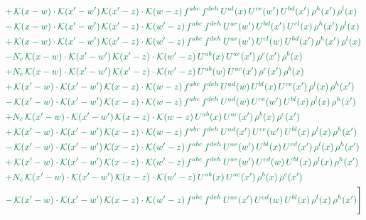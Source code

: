 \documentclass[10pt]{article}
\numberwithin{equation}{section}
\begin{document}
\begin{align}
&{\color{JIM} +\,\mathcal{K}(x-w)\cdot\mathcal{K}(x'-w')\,\mathcal{K}(x'-z)\cdot\mathcal{K}(w-z)\,f^{abc}\,f^{deh}\,U^{al}(x)\,U^{ce}(w')\,U^{bd}(x')\,\rho^{h}(x')\,\rho^{l}(x)} \notag\\
&{\color{JIM} -\,\mathcal{K}(x-w)\cdot\mathcal{K}(x'-w')\,\mathcal{K}(x'-z)\cdot\mathcal{K}(w'-z)\,f^{abc}\,f^{deh}\,U^{ae}(w')\,U^{bd}(x')\,U^{cl}(x)\,\rho^{h}(x')\,\rho^{l}(x)} \notag\\
&{\color{JIM} +\,\mathcal{K}(x-w)\cdot\mathcal{K}(x'-w')\,\mathcal{K}(x'-z)\cdot\mathcal{K}(w'-z)\,f^{abc}\,f^{deh}\,U^{ae}(w')\,U^{cl}(w)\,U^{bd}(x')\,\rho^{h}(x')\,\rho^{l}(x)} \notag\\
&{\color{JIM} -N_{c}\,\mathcal{K}(x-w)\cdot\mathcal{K}(x'-w')\,\mathcal{K}(x'-z)\cdot\mathcal{K}(w'-z)\,U^{ab}(x)\,U^{ac}(x')\,\rho^{c}(x')\,\rho^{b}(x)} \notag\\
&{\color{JIM} +N_{c}\,\mathcal{K}(x-w)\cdot\mathcal{K}(x'-w')\,\mathcal{K}(x'-z)\cdot\mathcal{K}(w'-z)\,U^{ab}(w)\,U^{ac}(x')\,\rho^{c}(x')\,\rho^{b}(x)} \notag\\
&{\color{JIM} +\,\mathcal{K}(x'-w)\cdot\mathcal{K}(x'-w')\,\mathcal{K}(x-z)\cdot\mathcal{K}(w-z)\,f^{abc}\,f^{deh}\,U^{ad}(w)\,U^{bl}(x)\,U^{ce}(x')\,\rho^{l}(x)\,\rho^{h}(x')} \notag\\
&{\color{JIM} -\,\mathcal{K}(x'-w)\cdot\mathcal{K}(x'-w')\,\mathcal{K}(x-z)\cdot\mathcal{K}(w-z)\,f^{abc}\,f^{deh}\,U^{ad}(w)\,U^{ce}(w')\,U^{bl}(x)\,\rho^{l}(x)\,\rho^{h}(x')} \notag\\
&{\color{JIM} +N_{c}\,\mathcal{K}(x'-w)\cdot\mathcal{K}(x'-w')\,\mathcal{K}(x-z)\cdot\mathcal{K}(w-z)\,U^{ab}(x)\,U^{ac}(x')\,\rho^{b}(x)\,\rho^{c}(x')} \notag\\
&{\color{JIM} +\,\mathcal{K}(x'-w)\cdot\mathcal{K}(x'-w')\,\mathcal{K}(x-z)\cdot\mathcal{K}(w-z)\,f^{abc}\,f^{deh}\,U^{ad}(x')\,U^{ce}(w')\,U^{bl}(x)\,\rho^{l}(x)\,\rho^{h}(x')} \notag\\
&{\color{JIM} -\,\mathcal{K}(x'-w)\cdot\mathcal{K}(x'-w')\,\mathcal{K}(x-z)\cdot\mathcal{K}(w'-z)\,f^{abc}\,f^{deh}\,U^{ae}(w')\,U^{bl}(x)\,U^{cd}(x')\,\rho^{l}(x)\,\rho^{h}(x')} \notag\\
&{\color{JIM} +\,\mathcal{K}(x'-w)\cdot\mathcal{K}(x'-w')\,\mathcal{K}(x-z)\cdot\mathcal{K}(w'-z)\,f^{abc}\,f^{deh}\,U^{ae}(w')\,U^{cd}(w)\,U^{bl}(x)\,\rho^{l}(x)\,\rho^{h}(x')} \notag\\
&{\color{JIM} +N_{c}\,\mathcal{K}(x'-w)\cdot\mathcal{K}(x'-w')\,\mathcal{K}(x-z)\cdot\mathcal{K}(w'-z)\,U^{ab}(x)\,U^{ac}(x')\,\rho^{b}(x)\,\rho^{c}(x')} \notag\\
&{\color{JIM} -\,\mathcal{K}(x'-w)\cdot\mathcal{K}(x'-w')\,\mathcal{K}(x-z)\cdot\mathcal{K}(w'-z)\,f^{abc}\,f^{deh}\,U^{ae}(x')\,U^{cd}(w)\,U^{bl}(x)\,\rho^{l}(x)\,\rho^{h}(x')}\Bigg] \end{align}
\end{document}
